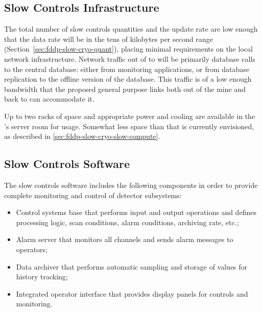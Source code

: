 


\subsection{Slow Controls Infrastructure}
\label{sec:fddp-slow-cryo-slow-infra}

The total number of slow controls quantities and the update rate are low enough
that the data rate will be in the tens of kilobytes per second range
(Section~\ref{sec:fddp-slow-cryo-quant}), placing minimal requirements
on the local network infrastructure.
Network traffic out of \surf to \fnal will be primarily database calls
to the central  database: either from monitoring applications, or from
database replication to the offline version of the  database.  This
traffic is of a low enough bandwidth that the proposed general purpose
links both out of the mine and back to \fnal can accommodate it.

Up to two racks of space and appropriate power and cooling are
available in the 's  server room for  usage.
Somewhat less space than that is currently envisioned, as described in
\ref{sec:fddp-slow-cryo-slow-compute}.

\subsection{Slow Controls Software}
\label{sec:fddp-slow-cryo-sw}


The slow controls software includes the following components in order 
to provide complete monitoring and control of detector subsystems:
%
\begin{itemize}
 \item{Control systems base} that performs input and output operations
  and defines processing logic, scan conditions, alarm conditions,
  archiving rate, etc.;
 \item{Alarm server} that monitors all channels and sends alarm
  messages to operators; 
 \item{Data archiver} that performs automatic sampling and storage of
  values for history tracking;
 \item{Integrated operator interface} that provides display panels for
  controls and monitoring.
\end{itemize}

